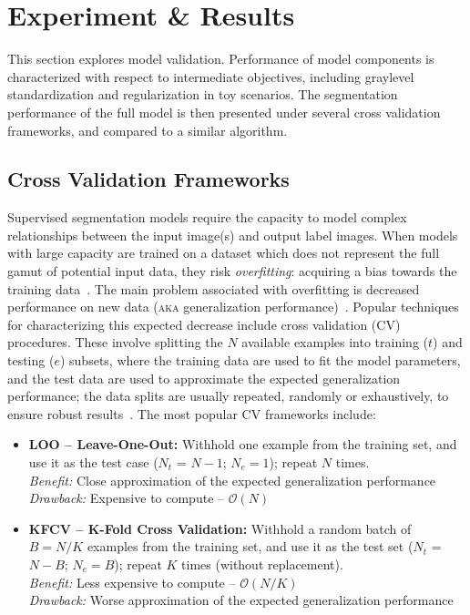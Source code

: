 \chapter{Experiment \& Results}
This section explores model validation.
Performance of model components is characterized with respect to intermediate objectives,
including graylevel standardization and regularization in toy scenarios.
The segmentation performance of the full model is then presented
under several cross validation frameworks, and compared to a similar algorithm.
\section{Cross Validation Frameworks}\label{s:CVframeworks}
Supervised segmentation models require the capacity to model
complex relationships between the input image(s) and output label images.
When models with large capacity are trained on
a dataset which does not represent the full gamut of potential input data,
they risk \textit{overfitting}: acquiring a bias towards the training data~\cite{Hawkins2004}.
The main problem associated with overfitting is decreased performance on new data
(\textsc{aka} generalization performance)~\cite{Hawkins2004}.
Popular techniques for characterizing this expected decrease include
cross validation (CV) procedures.
These involve splitting the $N$ available examples into training ($t$) and testing ($e$) subsets,
where the training data are used to fit the model parameters,
and the test data are used to approximate the expected generalization performance;
the data splits are usually repeated, randomly or exhaustively,
to ensure robust results~\cite{Arlot2010}.
The most popular CV frameworks include:
\begin{itemize}
  \item\textbf{LOO -- Leave-One-Out:}
  Withhold one example from the training set,
  and use it as the test case ($N_t$ = $N-1$; $N_e = 1$);
  repeat $N$ times.
  \\\textit{Benefit:} Close approximation of the expected generalization performance
  \\\textit{Drawback:} Expensive to compute -- $\mathcal{O}(N)$
  \item\textbf{KFCV -- K-Fold Cross Validation:}
  Withhold a random batch of $B = N/K$ examples from the training set,
  and use it as the test set ($N_t$ = $N-B$; $N_e = B$);
  repeat $K$ times (without replacement).
  \\\textit{Benefit:} Less expensive to compute -- $\mathcal{O}(N/K)$
  \\\textit{Drawback:} Worse approximation of the expected generalization performance
\end{itemize}
